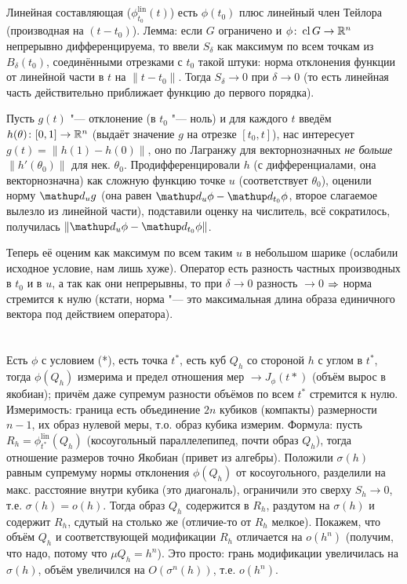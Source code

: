 \section{} %
Линейная составляющая ($\phi^{\mathup{lin}}_{t_0} (t)$) есть $\phi(t_0)$ плюс линейный член Тейлора (производная на $(t-t_0)$).
Лемма: если $G$ ограничено и $\phi \colon \operatorname{cl} G \to \mathbb{R}^n$ непрерывно дифференцируема, то ввели $S_\delta$ как максимум
по всем точкам из $B_\delta(t_0)$, соединёнными отрезками с $t_0$ такой штуки: норма отклонения функции от линейной части в $t$ на $\|t-t_0\|$.
Тогда $S_\delta \to 0$ при $\delta \to 0$ (то есть линейная часть действительно приближает функцию до первого порядка).

Пусть $g(t)$ "--- отклонение (в $t_0$ "--- ноль) и для каждого $t$ введём $h(\theta) \colon [0,1] \to \mathbb{R}^n$ (выдаёт значение $g$ на отрезке $[t_0, t]$),
нас интересует $g(t)=\|h(1)-h(0)\|$, оно по Лагранжу для векторнозначных \textit{не больше} $\|h'(\theta_0)\|$ для нек. $\theta_0$.
Продифференцировали $h$ (с дифференциалами, она векторнозначна) как сложную функцию точке $u$ (соответствует $\theta_0$), оценили норму $\d_u g$
(она равен $\d_u \phi - \d_{t_0} \phi$, второе слагаемое вылезло из линейной части), подставили оценку на числитель, всё сократилось, получилась $\|\d_u \phi - \d_{t_0} \phi\|$.

Теперь её оценим как максимум по всем таким $u$ в небольшом шарике (ослабили исходное условие, нам лишь хуже).
Оператор есть разность частных производных в $t_0$ и в $u$, а так как они непрерывны, то при $\delta\to0$ разность $\to 0$ $\Rightarrow$ норма стремится к нулю
(кстати, норма "--- это максимальная длина образа единичного вектора под действием оператора).

\section{} %
Есть $\phi$ с условием (*), есть точка $t^*$, есть куб $Q_h$ со стороной $h$ с углом в $t^*$, тогда $\phi(Q_h)$ измерима и предел отношения мер $\to J_{\phi}(t*)$
(объём вырос в якобиан); причём даже супремум разности объёмов по всем $t^*$ стремится к нулю.
Измеримость: граница есть объединение $2n$ кубиков (компакты) размерности $n-1$, их образ нулевой меры, т.о. образ кубика измерим.
Формула: пусть $R_h=\phi^{\mathup{lin}}_{t^*}(Q_h)$ (косоугольный параллелепипед, почти образ $Q_h$), тогда отношение размеров точно Якобиан (привет из алгебры).
Положили $\sigma(h)$ равным супремуму нормы отклонения $\phi(Q_h)$ от косоугольного, разделили на макс. расстояние внутри кубика (это диагональ), ограничили это сверху $S_h \to 0$,
т.е. $\sigma(h)=o(h)$.
Тогда образ $Q_h$ содержится в $R_h$, раздутом на $\sigma(h)$ и содержит $R_h$, сдутый на столько же (отличие-то от $R_h$ мелкое).
Покажем, что объём $Q_h$ и соответствующей модификации $R_h$ отличается на $o(h^n)$ (получим, что надо, потому что $\mu Q_h = h^n$).
Это просто: грань модификации увеличилась на $\sigma(h)$, объём увеличился на $O(\sigma^n(h))$, т.е. $o(h^n)$.

